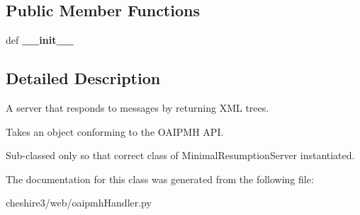 \subsection*{Public Member Functions}
\begin{DoxyCompactItemize}
\item 
\hypertarget{classcheshire3_1_1web_1_1oaipmh_handler_1_1_minimal_x_m_l_tree_server_a7c8a05fcdd59d6de56cffbbd2c6b0119}{def {\bfseries \-\_\-\-\_\-init\-\_\-\-\_\-}}\label{classcheshire3_1_1web_1_1oaipmh_handler_1_1_minimal_x_m_l_tree_server_a7c8a05fcdd59d6de56cffbbd2c6b0119}

\end{DoxyCompactItemize}


\subsection{Detailed Description}
\begin{DoxyVerb}A server that responds to messages by returning XML trees.

Takes an object conforming to the OAIPMH API.

Sub-classed only so that correct class of MinimalResumptionServer
instantiated.
\end{DoxyVerb}
 

The documentation for this class was generated from the following file\-:\begin{DoxyCompactItemize}
\item 
cheshire3/web/oaipmh\-Handler.\-py\end{DoxyCompactItemize}
